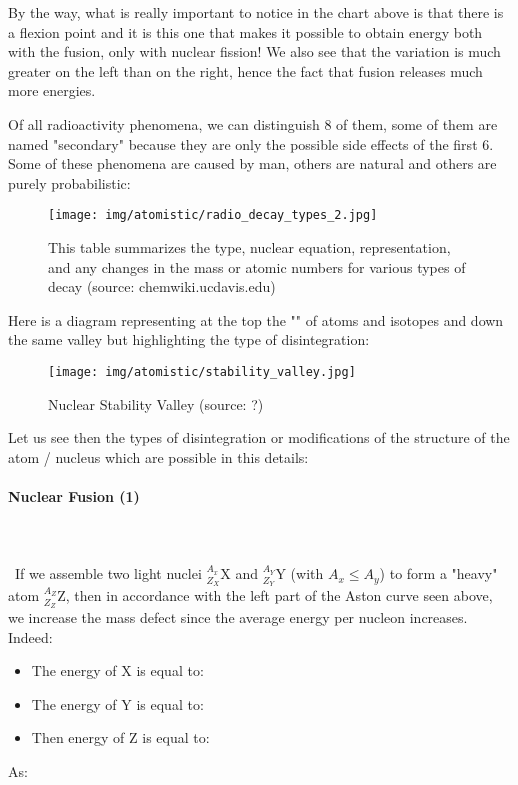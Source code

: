 	By the way, what is really important to notice in the chart above is that there is a flexion point and it is this one that makes it possible to obtain energy both with the fusion, only with nuclear fission! We also see that the variation is much greater on the left than on the right, hence the fact that fusion releases much more energies.

	Of all radioactivity phenomena, we can distinguish $8$ of them, some of them are named "secondary" because they are only the possible side effects of the first $6$. Some of these phenomena are caused by man, others are natural and others are purely probabilistic:
	\begin{figure}[H]
		\centering
		\texttt{[image: img/atomistic/radio\_decay\_types\_2.jpg]}
		\caption{This table summarizes the type, nuclear equation, representation, and any changes in the mass or atomic numbers for various types of decay (source: chemwiki.ucdavis.edu)}
	\end{figure}
	Here is a diagram representing at the top the "" of atoms and isotopes and down the same valley but highlighting the type of disintegration:
	\begin{figure}[H]
		\centering
		\texttt{[image: img/atomistic/stability\_valley.jpg]}
		\caption{Nuclear Stability Valley (source: ?)}
	\end{figure}
	Let us see then the types of disintegration or modifications of the structure of the atom / nucleus which are possible in this details:
	
	\paragraph{Nuclear Fusion (1)}\mbox{}\\\\\
	If we assemble two light nuclei $_{Z_X}^{A_x}\mathrm{X}$ and $_{Z_Y}^{A_Y}\mathrm{Y}$ (with $A_x \le A_y$) to form a "heavy" atom $_{Z_Z}^{A_Z}\mathrm{Z}$, then in accordance with the left part of the Aston curve seen above, we increase the mass defect since the average energy per nucleon increases. Indeed:
	\begin{itemize}
		\item The energy of $\mathrm{X}$ is equal to:
		
	
		\item The energy of $\mathrm{Y}$ is equal to:
		
		
		\item Then energy of $\mathrm{Z}$ is equal to:
		
	\end{itemize}
	As:
	
